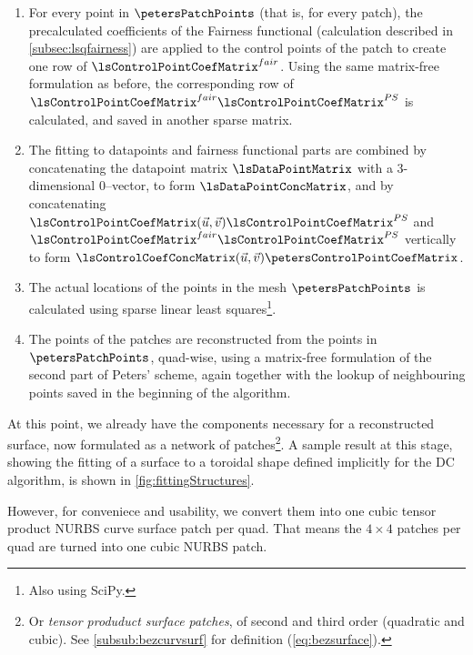 \begin{enumerate}[resume]
\item For every point in $\petersPatchPoints$ (that is, for every \Bez patch), the precalculated coefficients of the Fairness functional (calculation described in \autoref{subsec:lsqfairness}) are applied to the \Bez control points of the patch to create one row of $\lsControlPointCoefMatrix^{fair}$. Using the same matrix-free formulation as before, the corresponding row of $\lsControlPointCoefMatrix^{fair}\lsControlPointCoefMatrix^{PS}$ is calculated, and saved in another sparse matrix.
\item The fitting to datapoints and fairness functional parts are combined by concatenating the datapoint matrix $\lsDataPointMatrix$ with a 3-dimensional $0$--vector, to form $\lsDataPointConcMatrix$, and by concatenating $\lsControlPointCoefMatrix(\vec{u},\vec{v})\lsControlPointCoefMatrix^{PS}$ and  $\lsControlPointCoefMatrix^{fair}\lsControlPointCoefMatrix^{PS}$ vertically to form $\lsControlCoefConcMatrix(\vec{u},\vec{v})\petersControlPointCoefMatrix$.
\item The actual locations of the points in the mesh $\petersPatchPoints$ is calculated using sparse linear least squares\footnote{Also using SciPy.}.
\item The \Bez points of the patches are reconstructed from the points in $\petersPatchPoints$, quad-wise, using a matrix-free formulation of the second part of Peters' scheme, again together with the lookup of neighbouring points saved in the beginning of the algorithm.
\end{enumerate}
At this point, we already have the components necessary for a reconstructed surface, now formulated as a network of \Bez patches\footnote{Or \emph{tensor produduct \Bez surface patches}, of second and third order (quadratic and cubic). See \autoref{subsub:bezcurvsurf} for definition (\autoref{eq:bezsurface}).}. A sample result at this stage, showing the fitting of a surface to a toroidal shape defined implicitly for the \acs{DC} algorithm, is shown in \autoref{fig:fittingStructures}. 

However, for conveniece and usability, we convert them into one cubic tensor product NURBS curve surface patch per quad. That means the $4\times4$ \Bez patches per quad are turned into one cubic NURBS patch. 

